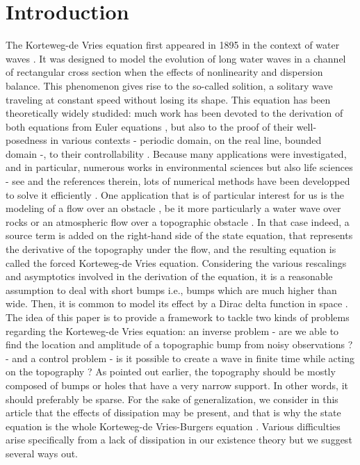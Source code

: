 
\section{Introduction}

The Korteweg-de Vries equation first appeared in 1895 in the context of water waves \cite{korteweg1895xli}. It was designed to model the evolution of long water waves in a channel of rectangular cross section when the effects of nonlinearity and dispersion balance. This phenomenon gives rise to the so-called solition, a solitary wave traveling at constant speed without losing its shape. This equation has been theoretically widely studided: much work has been devoted to the derivation of both equations from Euler equations \cite{shen1992forced,constantin2008,su2003korteweg}, but also to the proof of their well-posedness in various contexts \cite{miura1976korteweg,kenig1993,bourgain1997periodic} - periodic domain, on the real line, bounded domain -, to their controllability \cite{rosier1997exact,glass2008some,coron2003exact,chapouly2009global}. 
Because many applications were investigated, and in particular, numerous works in environmental sciences but also life sciences - see \cite{dauxois2006physics,whitham2011linear,Crepeau2007594,yomosa1987} and the references therein, lots of numerical methods have been developped to solve it efficiently \cite{trefethen2000spectral,shen2003new,ma2000legendre}. One application that is of particular interest for us is the modeling of a flow over an obstacle \cite{milewski2004forced,shen1992forced,shen1996accuracy}, be it more particularly a water wave over rocks or an atmospheric flow over a topographic obstacle \cite{baines1997topographic}. In that case indeed, a source term is added on the right-hand side of the state equation, that represents the derivative of the topography under the flow, and the resulting equation is called the forced Korteweg-de Vries equation. Considering the various rescalings and asymptotics involved in the derivation of the \KdV equation, it is a reasonable assumption to deal with short bumps i.e., bumps which are much higher than wide. Then, it is common to model its effect by a Dirac delta function in space \cite{shen1996accuracy, shen2000bumpdirac}. The idea of this paper is to provide a framework to tackle two kinds of problems regarding the Korteweg-de Vries equation: an inverse problem - are we able to find the location and amplitude of a topographic bump from noisy observations ? -  and a control problem - is it possible to create a wave in finite time while acting on the topography ? As pointed out earlier, the topography should be mostly composed of bumps or holes that have a very narrow support. In other words, it should preferably be sparse. For the sake of generalization, we consider in this article that the effects of dissipation may be present, and that is why the state equation is the whole Korteweg-de Vries-Burgers equation \cite{su2003korteweg}. Various difficulties arise specifically from a lack of dissipation in our existence theory but we suggest several ways out.


